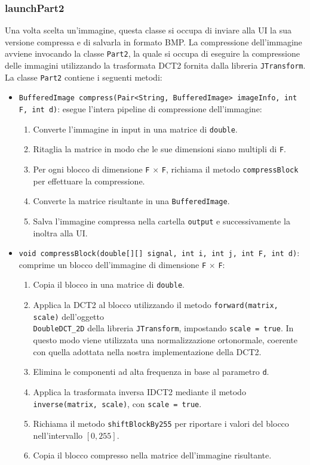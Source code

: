 \subsubsection{launchPart2}
Una volta scelta un'immagine, questa classe si occupa di inviare alla UI la sua versione compressa e di salvarla
in formato BMP. La compressione dell'immagine avviene invocando la classe \texttt{Part2}, la quale si occupa di 
eseguire la compressione delle immagini utilizzando la trasformata DCT2 fornita dalla libreria
\texttt{JTransform}.
La classe \texttt{Part2} contiene i seguenti metodi:
\begin{itemize}
    \item \texttt{BufferedImage compress(Pair<String, BufferedImage> imageInfo, int F, int d)}: esegue l'intera pipeline di compressione dell'immagine:
    \begin{enumerate}
        \item Converte l'immagine in input in una matrice di \texttt{double}.
        \item Ritaglia la matrice in modo che le sue dimensioni siano multipli di \texttt{F}.
        \item Per ogni blocco di dimensione \texttt{F} $\times$ \texttt{F}, richiama il metodo \texttt{compressBlock} per effettuare la compressione.
        \item Converte la matrice risultante in una \texttt{BufferedImage}.
        \item Salva l'immagine compressa nella cartella \texttt{output} e successivamente la inoltra alla UI.
    \end{enumerate}

    \item \texttt{void compressBlock(double[][] signal, int i, int j, int F, int d)}: comprime un blocco dell'immagine di dimensione \texttt{F} $\times$ \texttt{F}:
    \begin{enumerate}
        \item Copia il blocco in una matrice di \texttt{double}.
        \item Applica la DCT2 al blocco utilizzando il metodo \texttt{forward(matrix, scale)} dell'oggetto \\ 
		\texttt{DoubleDCT\_2D} della libreria \texttt{JTransform}, impostando \texttt{scale = true}.
		In questo modo viene utilizzata una normalizzazione ortonormale, coerente con quella adottata nella nostra implementazione della DCT2.
        \item Elimina le componenti ad alta frequenza in base al parametro \texttt{d}.
        \item Applica la trasformata inversa IDCT2 mediante il metodo \texttt{inverse(matrix, scale)}, con \texttt{scale = true}.
        \item Richiama il metodo \texttt{shiftBlockBy255} per riportare i valori del blocco nell'intervallo \([0, 255]\).
        \item Copia il blocco compresso nella matrice dell'immagine risultante.
    \end{enumerate}


\end{itemize}
